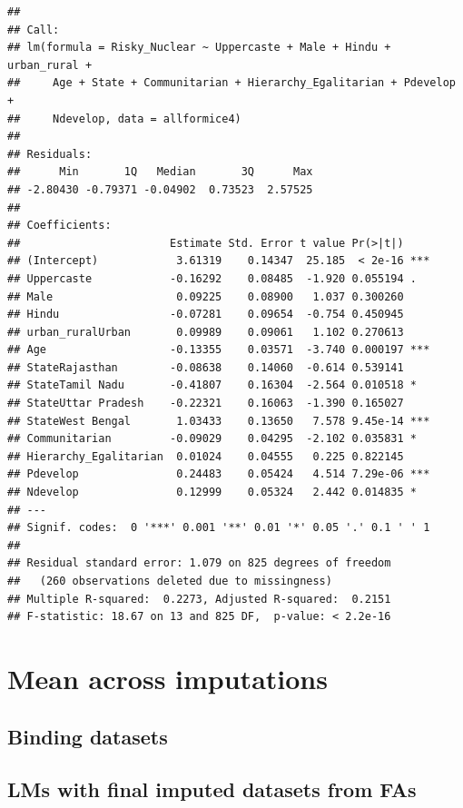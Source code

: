 \documentclass[
]{article}
\begin{document}
\begin{verbatim}
## 
## Call:
## lm(formula = Risky_Nuclear ~ Uppercaste + Male + Hindu + urban_rural + 
##     Age + State + Communitarian + Hierarchy_Egalitarian + Pdevelop + 
##     Ndevelop, data = allformice4)
## 
## Residuals:
##      Min       1Q   Median       3Q      Max 
## -2.80430 -0.79371 -0.04902  0.73523  2.57525 
## 
## Coefficients:
##                       Estimate Std. Error t value Pr(>|t|)    
## (Intercept)            3.61319    0.14347  25.185  < 2e-16 ***
## Uppercaste            -0.16292    0.08485  -1.920 0.055194 .  
## Male                   0.09225    0.08900   1.037 0.300260    
## Hindu                 -0.07281    0.09654  -0.754 0.450945    
## urban_ruralUrban       0.09989    0.09061   1.102 0.270613    
## Age                   -0.13355    0.03571  -3.740 0.000197 ***
## StateRajasthan        -0.08638    0.14060  -0.614 0.539141    
## StateTamil Nadu       -0.41807    0.16304  -2.564 0.010518 *  
## StateUttar Pradesh    -0.22321    0.16063  -1.390 0.165027    
## StateWest Bengal       1.03433    0.13650   7.578 9.45e-14 ***
## Communitarian         -0.09029    0.04295  -2.102 0.035831 *  
## Hierarchy_Egalitarian  0.01024    0.04555   0.225 0.822145    
## Pdevelop               0.24483    0.05424   4.514 7.29e-06 ***
## Ndevelop               0.12999    0.05324   2.442 0.014835 *  
## ---
## Signif. codes:  0 '***' 0.001 '**' 0.01 '*' 0.05 '.' 0.1 ' ' 1
## 
## Residual standard error: 1.079 on 825 degrees of freedom
##   (260 observations deleted due to missingness)
## Multiple R-squared:  0.2273, Adjusted R-squared:  0.2151 
## F-statistic: 18.67 on 13 and 825 DF,  p-value: < 2.2e-16
\end{verbatim}

\hypertarget{mean-across-imputations}{%
\section{Mean across imputations}\label{mean-across-imputations}}

\hypertarget{binding-datasets}{%
\subsection{Binding datasets}\label{binding-datasets}}

\hypertarget{lms-with-final-imputed-datasets-from-fas}{%
\subsection{LMs with final imputed datasets from
FAs}\label{lms-with-final-imputed-datasets-from-fas}}
\end{document}
